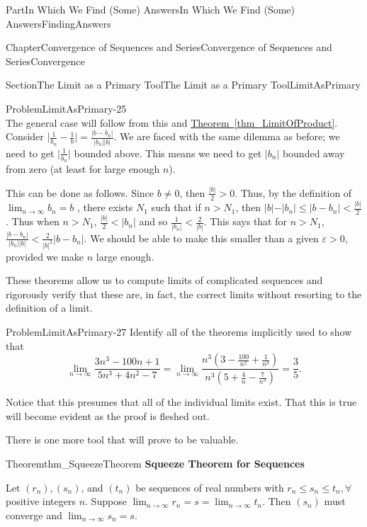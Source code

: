 \documentclass[oneside,10pt,]{book}
\newcommand{\xreffont}{\relax}
\newcommand{\terminology}[1]{\textbf{#1}}
\numberwithin{equation}{part}
\def\limit#1#2#3{{\displaystyle\lim_{#1\rightarrow #2}#3}}
\newcommand{\eps}{\varepsilon}
\newcommand{\lt}{<}
\begin{document}
\begin{partptx}{Part}{In Which We Find (Some) Answers}{}{In Which We Find (Some) Answers}{}{}{FindingAnswers}
\begin{chapterptx}{Chapter}{Convergence of Sequences and Series}{}{Convergence of Sequences and Series}{}{}{Convergence}
\begin{sectionptx}{Section}{The Limit as a Primary Tool}{}{The Limit as a Primary Tool}{}{}{LimitAsPrimary}
\begin{problem}{Problem}{}{LimitAsPrimary-25}
\begin{equation*}
\end{equation*}
The general case will follow from this and \hyperref[thm_LimitOfProduct]{Theorem~{\xreffont\ref{thm_LimitOfProduct}}}. Consider \(\big|\frac{1}{b_n}-\frac{1}{b}\big|=\frac{|b-b_n|}{|b_n||b|}\). We are faced with the same dilemma as before; we need to get \(\big|\frac{1}{b_n}\big|\) bounded above. This means we need to get \(|b_n|\) bounded away from zero (at least for large enough \(n\)).%
\par
This can be done as follows. Since \(b\neq 0\), then \(\frac{|b|}{2}>0\). Thus, by the definition of \(\lim_{n\rightarrow\infty}b_n=b\) , there exists \(N_1\) such that if \(n>N_1\), then \(|b\mathopen|-|b_n|\leq\big|b-b_n\big|\lt \frac{|b|}{2}\). Thus when \(n>N_1\), \(\frac{|b|}{2}\lt |b_n|\) and so \(\frac{1}{|b_n|}\lt \frac{2}{|b|}\). This says that for \(n>N_1\), \(\frac{|b-b_n|}{|b_n||b|}\lt \frac{2}{|b|^2}|b-b_n|\). We should be able to make this smaller than a given \(\eps>0\), provided we make \(n\) large enough.%
\end{problem}
These theorems allow us to compute limits of complicated sequences and rigorously verify that these are, in fact, the correct limits without resorting to the definition of a limit.%
\begin{problem}{Problem}{}{LimitAsPrimary-27}%
 Identify all of the theorems implicitly used to show that%
\begin{equation*}
\lim_{n\rightarrow\infty}\frac{3n^3-100n+1}{5n^3+4n^2-7}=\lim_{n \rightarrow\infty}\frac{n^3\left(3-\frac{100}{n^2}+\frac{1}{n^3}\right)}{n^3 \left(5+\frac{4}{n}-\frac{7}{n^3}\right)}=\frac{3}{5}\text{.}
\end{equation*}
%
\par
Notice that this presumes that all of the individual limits exist. That this is true will become evident as the proof is fleshed out.%
\end{problem}
There is one more tool that will prove to be valuable.%
\begin{theorem}{Theorem}{}{}{thm_SqueezeTheorem}%
%
\terminology{Squeeze Theorem for Sequences}%
\par
Let \(\left(r_n\right),\left(s_n\right)\), and \(\left(t_n\right)\) be sequences of real numbers with \(r_n\leq s_n\leq t_n,\forall\) positive integers \(n\). Suppose \(\limit{n}{\infty}{r_n}=s=\limit{n}{\infty}{t_n}\). Then \(\left(s_n\right)\) must converge and \(\limit{n}{\infty}{s_n}=s\).%
\end{theorem}

\end{sectionptx}
\end{chapterptx}
\end{partptx}
\end{document}
